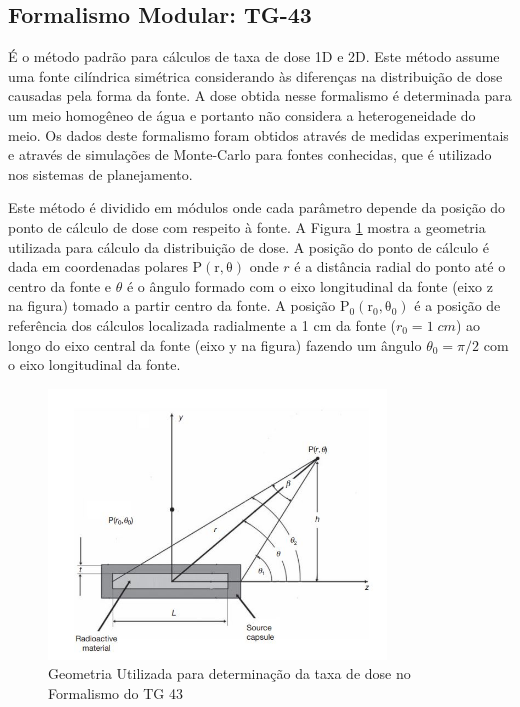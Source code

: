 \documentclass[11pt,a4paper]{article}
\begin{document}
		\subsection{Formalismo Modular: TG-43}

			É o método padrão para cálculos de taxa de dose 1D e 2D. Este método assume uma fonte cilíndrica simétrica considerando às diferenças na distribuição de dose causadas pela forma da fonte. A dose obtida nesse formalismo é determinada para um meio homogêneo de água e portanto não considera a heterogeneidade do meio. Os dados deste formalismo foram obtidos através de medidas experimentais e através de simulações de Monte-Carlo para fontes conhecidas, que é utilizado nos sistemas de planejamento.

			Este método é dividido em módulos onde cada parâmetro depende da posição do ponto de cálculo de dose com respeito à fonte. A Figura \ref{img:FormalismoTg43} mostra a geometria utilizada para cálculo da distribuição de dose. A posição do ponto de cálculo é dada em coordenadas polares $\mathrm{P(r, \theta)}$ onde $r$ é a distância radial do ponto até o centro da fonte e $\theta$ é o ângulo formado com o eixo longitudinal da fonte (eixo z na figura) tomado a partir centro da fonte. A posição $\mathrm{P_0(r_0, \theta_0)}$ é a posição de referência dos cálculos localizada radialmente a 1 cm da fonte ($r_0 = 1 \; cm$) ao longo do eixo central da fonte (eixo y na figura) fazendo um ângulo $\theta_0 = \pi / 2$ com o eixo longitudinal da fonte.


				\begin{figure}[h]
					\centering
					\includegraphics[width=0.8\textwidth]{Imagens/esquemaFormalismoTg43.JPG}
					\caption{Geometria Utilizada para determinação da taxa de dose no Formalismo do TG 43}
					\label{img:FormalismoTg43}
				\end{figure}
\end{document}
